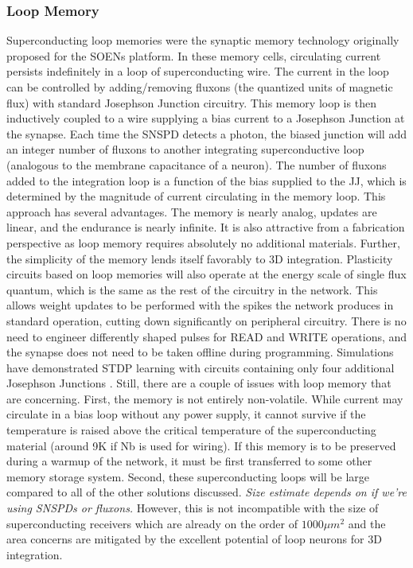 \documentclass{article}
\begin{document}
\subsubsection{Loop Memory}
Superconducting loop memories were the synaptic memory technology originally proposed for the SOENs platform. In these memory cells, circulating current persists indefinitely in a loop of superconducting wire. The current in the loop can be controlled by adding/removing fluxons (the quantized units of magnetic flux) with standard Josephson Junction circuitry. This memory loop is then inductively coupled to a wire supplying a bias current to a Josephson Junction at the synapse. Each time the SNSPD detects a photon, the biased junction will add an integer number of fluxons to another integrating superconductive loop (analogous to the membrane capacitance of a neuron). The number of fluxons added to the integration loop is a function of the bias supplied to the JJ, which is determined by the magnitude of current circulating in the memory loop. This approach has several advantages. The memory is nearly analog, updates are linear, and the endurance is nearly infinite. It is also attractive from a fabrication perspective as loop memory requires absolutely no additional materials. Further, the simplicity of the memory lends itself favorably to 3D integration. Plasticity circuits based on loop memories will also operate at the energy scale of single flux quantum, which is the same as the rest of the circuitry in the network. This allows weight updates to be performed with the spikes the network produces in standard operation, cutting down significantly on peripheral circuitry. There is no need to engineer differently shaped pulses for READ and WRITE operations, and the synapse does not need to be taken offline during programming. Simulations have demonstrated STDP learning with circuits containing only four additional Josephson Junctions \cite{shainline2019superconducting}. Still, there are a couple of issues with loop memory that are concerning. First, the memory is not entirely non-volatile. While current may circulate in a bias loop without any power supply, it cannot survive if the temperature is raised above the critical temperature of the superconducting material (around 9K if Nb is used for wiring). If this memory is to be preserved during a warmup of the network, it must be first transferred to some other memory storage system. Second, these superconducting loops will be large compared to all of the other solutions discussed. \textit{Size estimate depends on if we're using SNSPDs or fluxons. } However, this is not incompatible with the size of superconducting receivers which are already on the order of $1000 \mu m^2$ and the area concerns are mitigated by the excellent potential of loop neurons for 3D integration.
\end{document}
